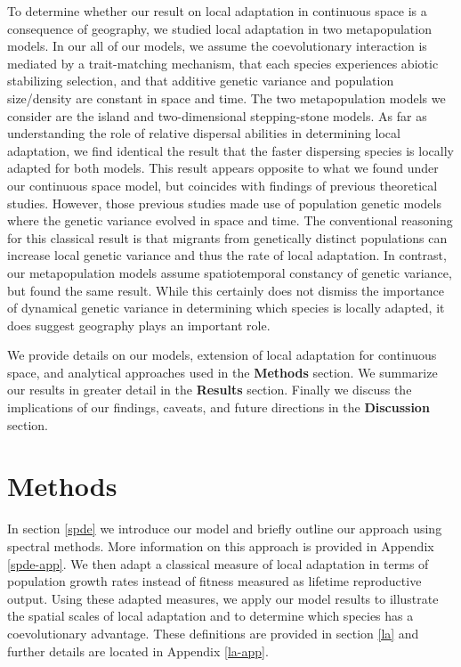 \documentclass{article}
\begin{document}
To determine whether our result on local adaptation in continuous space
is a consequence of geography, we studied local adaptation in two
metapopulation models. In our all of our models, we assume the
coevolutionary interaction is mediated by a trait-matching mechanism,
that each species experiences abiotic stabilizing selection, and that
additive genetic variance and population size/density are constant in
space and time. The two metapopulation models we consider are the island
and two-dimensional stepping-stone models. As far as understanding the
role of relative dispersal abilities in determining local adaptation, we
find identical the result that the faster dispersing species is locally
adapted for both models. This result appears opposite to what we found
under our continuous space model, but coincides with findings of
previous theoretical studies. However, those previous studies made use
of population genetic models where the genetic variance evolved in space
and time. The conventional reasoning for this classical result is that
migrants from genetically distinct populations can increase local
genetic variance and thus the rate of local adaptation. In contrast, our
metapopulation models assume spatiotemporal constancy of genetic
variance, but found the same result. While this certainly does not
dismiss the importance of dynamical genetic variance in determining
which species is locally adapted, it does suggest geography plays an
important role.

We provide details on our models, extension of local adaptation for
continuous space, and analytical approaches used in the \textbf{Methods}
section. We summarize our results in greater detail in the
\textbf{Results} section. Finally we discuss the implications of our
findings, caveats, and future directions in the \textbf{Discussion}
section.

\hypertarget{methods}{%
\section{Methods}\label{methods}}

In section \ref{spde} we introduce our model and briefly outline our
approach using spectral methods. More information on this approach is
provided in Appendix \ref{spde-app}. We then adapt a classical measure
of local adaptation in terms of population growth rates instead of
fitness measured as lifetime reproductive output. Using these adapted
measures, we apply our model results to illustrate the spatial scales of
local adaptation and to determine which species has a coevolutionary
advantage. These definitions are provided in section \ref{la} and
further details are located in Appendix \ref{la-app}.
\end{document}
